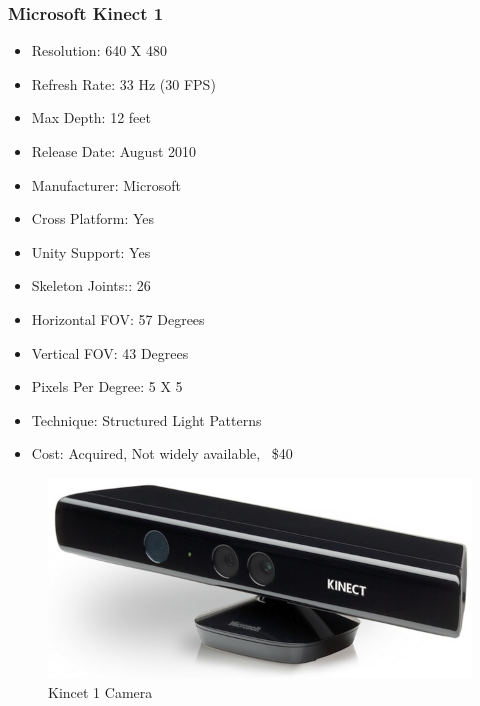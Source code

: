 \documentclass[a4paper,10pt]{article}
\begin{document}
\subsubsection{Microsoft Kinect 1}
\begin{itemize}
  \item Resolution: 640 X 480
  \item Refresh Rate: 33 Hz (30 FPS)
  \item Max Depth: 12 feet
  \item Release Date: August 2010 
  \item Manufacturer: Microsoft
  \item Cross Platform: Yes
  \item Unity Support: Yes
  \item Skeleton Joints:: 26
  \item Horizontal FOV: 57 Degrees
  \item Vertical FOV: 43 Degrees
  \item Pixels Per Degree: 5 X 5
  \item Technique: Structured Light Patterns
  \item Cost: Acquired, Not widely available, ~\$40
\end{itemize}
\begin{figure}[H]
	\includegraphics[width=\linewidth,height=\paperheight,keepaspectratio]{kinect1.jpg}
	\caption{Kincet 1 Camera}
	\label{fig:k1Cam}
	\end{figure}
	\pagebreak
\end{document}
